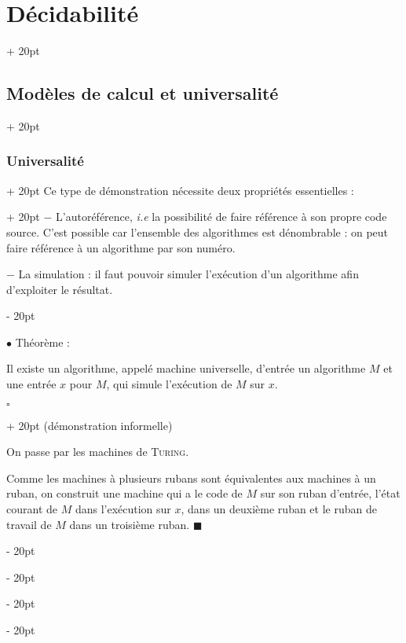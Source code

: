 \documentclass[a4paper, 12pt, twoside]{article}
\newcommand{\ind}[1][20pt]{\advance\leftskip + #1}
\newcommand{\deind}[1][20pt]{\advance\leftskip - #1}
\newenvironment{indt}[2][20pt]{#2 \par \ind[#1]}{\par \deind} %
\newenvironment{proof}[1][{}]{\begin{indt}{$\square$ #1}}{$\blacksquare$ \end{indt}}
\begin{document}
\begin{indt}{\section{Décidabilité}}
\begin{indt}{\subsection{Modèles de calcul et universalité}}
\begin{indt}{\subsubsection{Universalité}}
                \begin{indt}{Ce type de démonstration nécessite deux propriétés essentielles :}
                    $-$ L'autoréférence, \textit{i.e} la possibilité de faire référence à son propre code source. C'est possible car l'ensemble des algorithmes est dénombrable : on peut faire référence à un algorithme par son numéro.

                    $-$ La simulation : il faut pouvoir simuler l'exécution d'un algorithme afin d'exploiter le résultat.
                \end{indt}

                \vspace{12pt}
                
                $\bullet$ Théorème :
                \begin{emphBox}
                    Il existe un algorithme, appelé machine universelle, d'entrée un algorithme $M$ et une entrée $x$ pour $M$, qui simule l'exécution de $M$ sur $x$.
                \end{emphBox}

                \begin{proof}
                    (démonstration informelle)

                    On passe par les machines de \textsc{Turing}.

                    Comme les machines à plusieurs rubans sont équivalentes aux machines à un ruban, on construit une machine qui a le code de $M$ sur son ruban d'entrée, l'état courant de $M$ dans l'exécution sur $x$, dans un deuxième ruban et le ruban de travail de $M$ dans un troisième ruban.
                \end{proof}
            \end{indt}
        \end{indt}
    \end{indt}
    
\end{document}
